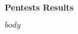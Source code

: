 \documentclass[a4paper,12pt]{article}
\begin{document}
\begin{center}
    \vspace*{1cm} %
    {\Huge\textbf{Pentests Results}} %
    \vspace*{1cm}
\end{center}

$body$
\end{document}
